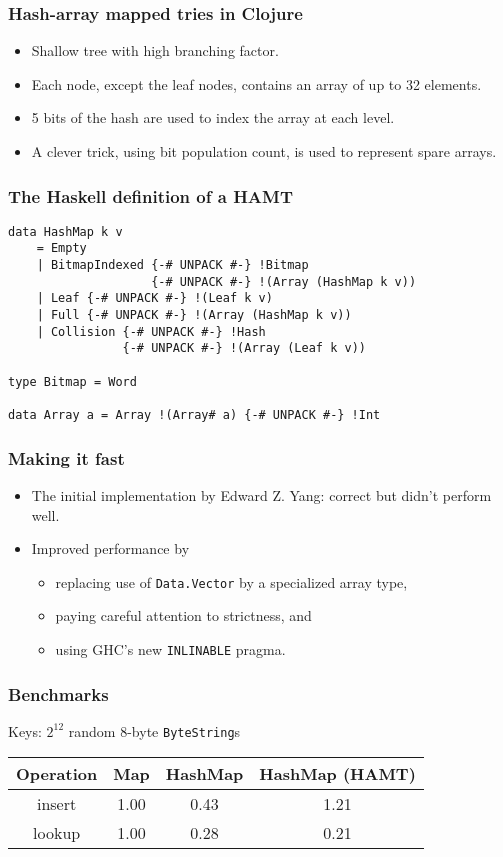 \documentclass{beamer}
\begin{document}
\begin{frame}
  \frametitle{Hash-array mapped tries in Clojure}
  \begin{itemize}
  \item Shallow tree with high branching factor.
  \item Each node, except the leaf nodes, contains an array of up to
    32 elements.
  \item 5 bits of the hash are used to index the array at each level.
  \item A clever trick, using bit population count, is used to
    represent spare arrays.
  \end{itemize}
\end{frame}

\begin{frame}[fragile]
  \frametitle{The Haskell definition of a HAMT}
  \begin{lstlisting}
data HashMap k v
    = Empty
    | BitmapIndexed {-# UNPACK #-} !Bitmap
                    {-# UNPACK #-} !(Array (HashMap k v))
    | Leaf {-# UNPACK #-} !(Leaf k v)
    | Full {-# UNPACK #-} !(Array (HashMap k v))
    | Collision {-# UNPACK #-} !Hash
                {-# UNPACK #-} !(Array (Leaf k v))

type Bitmap = Word

data Array a = Array !(Array# a) {-# UNPACK #-} !Int
  \end{lstlisting}
\end{frame}

\begin{frame}
  \frametitle{Making it fast}
  \begin{itemize}
  \item The initial implementation by Edward Z. Yang: correct but
    didn't perform well.
    \item Improved performance by
      \begin{itemize}
        \item replacing use of \lstinline!Data.Vector! by a
          specialized array type,
        \item paying careful attention to strictness, and
        \item using GHC's new \texttt{INLINABLE} pragma.
      \end{itemize}
  \end{itemize}
\end{frame}

\begin{frame}
  \frametitle{Benchmarks}

  Keys: $2^{12}$ random 8-byte \lstinline!ByteString!s

  \bigskip
  \begin{tabular}{|c|c|c|c|}
    \hline \textbf{Operation} & \textbf{Map} & \textbf{HashMap} &
    \textbf{HashMap (HAMT)} \\
    \hline insert & 1.00 & 0.43 & 1.21 \\
    \hline lookup & 1.00 & 0.28 & 0.21 \\
    \hline
  \end{tabular}
\end{frame}
\end{document}
